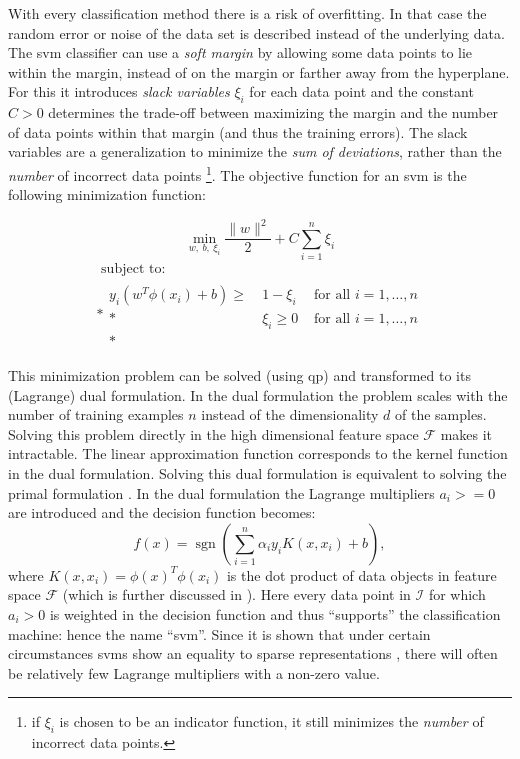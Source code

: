 With every classification method there is a risk of overfitting.
In that case the random error or noise of the data set is described instead of the underlying data.
The \gls{svm} classifier can use a \emph{soft margin} by allowing some data points to lie within the margin, instead of on the margin or farther away from the hyperplane.
For this it introduces \emph{slack variables} $\xi_i$ for each data point and the constant $C > 0$ determines the trade-off between maximizing the margin and the number of data points within that margin (and thus the training errors).
The slack variables are a generalization to minimize the \emph{sum of deviations}, rather than the \emph{number} of incorrect data points \cite{cherkassky2007learning}\footnote{if $\xi_i$ is chosen to be an indicator function, it still minimizes the \emph{number} of incorrect data points.}.
The objective function for an \gls{svm} is the following minimization function:

\begin{equation}\label{eq:svm_objective}
  \operatorname*{min}_{w,\ b,\ \xi_i} \frac{ \lVert{w}\rVert^2 }{2} + C \sum_{i=1}^n \xi_i
\end{equation}
\begin{equation}
  \begin{multlined}
  \mbox{ subject to: } \\*
  \begin{aligned}
  y_i( w^T \phi(x_i) + b) \geq \: & 1 - \xi_i & \mbox{ for all } i = 1, \dots, n \\*
   & \xi_i \geq 0 & \mbox{ for all } i = 1, \dots, n\\*
  \end{aligned}
  \end{multlined}
\end{equation}

This minimization problem can be solved (using \gls{qp}) and transformed to its (Lagrange) dual formulation.
In the dual formulation the problem scales with the number of training examples $n$ instead of the dimensionality $d$ of the samples.
Solving this problem directly in the high dimensional feature space $\mathcal{F}$ makes it intractable.
The linear approximation function corresponds to the kernel function in the dual formulation.
Solving this dual formulation is equivalent to solving the primal formulation \cite{cherkassky2007learning}.
In the dual formulation the Lagrange multipliers $a_i >= 0$ are introduced and the decision function becomes:
\begin{equation}\label{eq:svm_lagrange}
  f(x) = \operatorname{sgn}( \sum_{i=1}^n \alpha_i y_i K(x, x_i) + b),
\end{equation}
where $K(x, x_i) = \phi(x)^T\phi(x_i)$ is the dot product of data objects in feature space $\mathcal{F}$ (which is further discussed in ).
Here every data point in $\mathcal{I}$ for which $a_i > 0$ is weighted in the decision function and thus ``supports'' the classification machine: hence the name ``\acrlong{svm}''.
Since it is shown that under certain circumstances \glspl{svm} show an equality to sparse representations \cite{girosi1998equivalence,smola1998connection}, there will often be relatively few Lagrange multipliers with a non-zero value.

